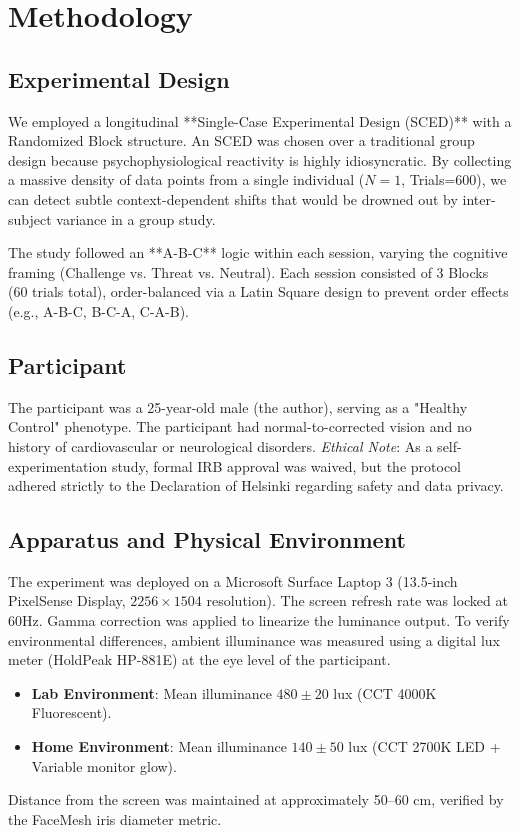 \documentclass[journal]{IEEEtran}
\begin{document}
\section{Methodology}

\subsection{Experimental Design}
We employed a longitudinal **Single-Case Experimental Design (SCED)** with a Randomized Block structure. An SCED was chosen over a traditional group design because psychophysiological reactivity is highly idiosyncratic. By collecting a massive density of data points from a single individual ($N=1$, Trials=600), we can detect subtle context-dependent shifts that would be drowned out by inter-subject variance in a group study.

The study followed an **A-B-C** logic within each session, varying the cognitive framing (Challenge vs. Threat vs. Neutral). Each session consisted of 3 Blocks (60 trials total), order-balanced via a Latin Square design to prevent order effects (e.g., A-B-C, B-C-A, C-A-B).

\subsection{Participant}
The participant was a 25-year-old male (the author), serving as a "Healthy Control" phenotype. The participant had normal-to-corrected vision and no history of cardiovascular or neurological disorders.
\textit{Ethical Note}: As a self-experimentation study, formal IRB approval was waived, but the protocol adhered strictly to the Declaration of Helsinki regarding safety and data privacy.

\subsection{Apparatus and Physical Environment}
The experiment was deployed on a Microsoft Surface Laptop 3 (13.5-inch PixelSense Display, $2256 \times 1504$ resolution). The screen refresh rate was locked at 60Hz. Gamma correction was applied to linearize the luminance output.
To verify environmental differences, ambient illuminance was measured using a digital lux meter (HoldPeak HP-881E) at the eye level of the participant.
\begin{itemize}
    \item \textbf{Lab Environment}: Mean illuminance $480 \pm 20$ lux (CCT 4000K Fluorescent).
    \item \textbf{Home Environment}: Mean illuminance $140 \pm 50$ lux (CCT 2700K LED + Variable monitor glow).
\end{itemize}
Distance from the screen was maintained at approximately 50--60 cm, verified by the FaceMesh iris diameter metric.
\end{document}
